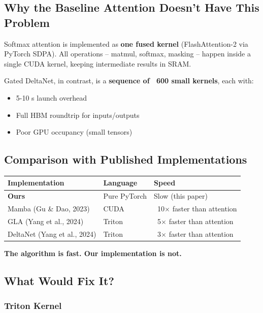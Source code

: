 \subsection{Why the Baseline Attention Doesn't Have This Problem}

Softmax attention is implemented as \textbf{one fused kernel} (FlashAttention-2 
via PyTorch SDPA). All operations -- matmul, softmax, masking -- happen 
inside a single CUDA kernel, keeping intermediate results in SRAM.

Gated DeltaNet, in contrast, is a \textbf{sequence of ~600 small kernels}, each 
with:
\begin{itemize}
\item 5-10  s launch overhead
\item Full HBM roundtrip for inputs/outputs
\item Poor GPU occupancy (small tensors)

\end{itemize}
\subsection{Comparison with Published Implementations}

\begin{table}[H]
\centering
\small
\begin{tabular}{lll}
\toprule
\textbf{Implementation} & \textbf{Language} & \textbf{Speed} \\
\midrule
\textbf{Ours} & Pure PyTorch & Slow (this paper) \\
Mamba (Gu \& Dao, 2023) & CUDA & ~10$\times$ faster than attention \\
GLA (Yang et al., 2024) & Triton & ~5$\times$ faster than attention \\
DeltaNet (Yang et al., 2024) & Triton & ~3$\times$ faster than attention \\
\bottomrule
\end{tabular}
\end{table}

\textbf{The algorithm is fast. Our implementation is not.}

\subsection{What Would Fix It?}

\subsubsection{Triton Kernel}

